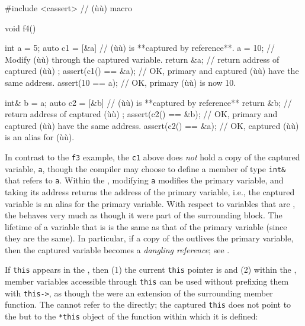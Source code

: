 \begin{emcppslisting}
#include <cassert>  // (ù{}ù) macro

void f4()
{
    int a = 5;
    auto c1 = [&a]      // (ù{}ù) is **captured by reference**.
    {
        a = 10;         // Modify (ù{}ù) through the captured variable.
        return &a;      // return address of captured (ù{}ù)
    };
    assert(c1() == &a); // OK, primary and captured (ù{}ù) have the same address.
    assert(10 == a);    // OK, primary (ù{}ù) is now 10.

    int& b = a;
    auto c2 = [&b]      // (ù{}ù) is **captured by reference**
    {
        return &b;      // return address of captured (ù{}ù)
    };
    assert(c2() == &b); // OK, primary and captured (ù{}ù) have the same address.
    assert(c2() == &a); // OK, captured (ù{}ù) is an alias for (ù{}ù).
}
\end{emcppslisting}
    

In contrast to the \lstinline!f3! example, the \lstinline!c1!  above does \emph{not} hold a copy of the captured variable,
\lstinline!a!, though the compiler may choose to define a member of type
\lstinline!int&! that refers to \lstinline!a!. Within the , modifying \lstinline!a! modifies the primary variable, and taking
its address returns the address of the primary variable, i.e., the
captured variable is an alias for the primary variable. With respect to
variables that are , the  behaves very much as though it were part of the surrounding block.
The lifetime of a variable that is  is the
same as that of the primary variable (since they are the same). In
particular, if a copy of the  outlives the
primary variable, then the captured variable becomes a \emph{dangling
reference}; see .

If \lstinline!this! appears in the , then (1) the
current \lstinline!this! pointer is  and (2)
within the , member variables accessible through
\lstinline!this! can be used without prefixing them with \lstinline!this->!,
as though the  were an extension of the surrounding
member function. The  cannot refer to the
 directly; the captured \lstinline!this! does not point to
the  but to the \lstinline!*this! object of the function
within which it is defined:

